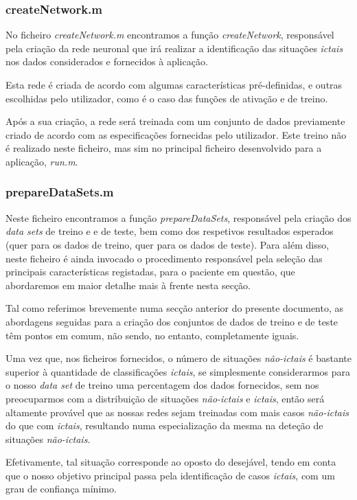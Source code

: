 \documentclass{article}
\begin{document}
\subsubsection{createNetwork.m}

No ficheiro \emph{createNetwork.m} encontramos a função \emph{createNetwork}, responsável pela criação da rede neuronal que irá realizar a identificação das  situações \emph{ictais} nos dados considerados e fornecidos à aplicação. 

Esta rede é criada de acordo com algumas características pré-definidas, e outras escolhidas pelo utilizador, como é o caso das funções de ativação e de treino.

Após a sua criação, a rede será treinada com um conjunto de dados previamente criado de acordo com as especificações fornecidas pelo utilizador. Este treino não é realizado neste ficheiro, mas sim no principal ficheiro desenvolvido para a aplicação, \emph{run.m}.

\subsubsection{prepareDataSets.m}

Neste ficheiro encontramos a função \emph{prepareDataSets}, responsável pela criação dos \emph{data sets} de treino e e de teste, bem como dos respetivos resultados esperados (quer para os dados de treino, quer para os dados de teste). Para além disso, neste ficheiro é ainda invocado o procedimento responsável pela seleção das principais características registadas, para o paciente em questão, que abordaremos em maior detalhe mais à frente nesta secção.

Tal como referimos brevemente numa secção anterior do presente documento, as abordagens seguidas para a criação dos conjuntos de dados de treino e de teste têm pontos em comum, não sendo, no entanto, completamente iguais.

Uma vez que, nos ficheiros fornecidos, o número de situações \emph{não-ictais} é bastante superior à quantidade de classificações \emph{ictais}, se simplesmente considerarmos para o nosso \emph{data set} de treino uma percentagem dos dados fornecidos, sem nos preocuparmos com a distribuição de situações \emph{não-ictais} e \emph{ictais}, então será altamente provável que as nossas redes sejam treinadas com mais casos \emph{não-ictais} do que com \emph{ictais}, resultando numa especialização da mesma na deteção de situações \emph{não-ictais}.

Efetivamente, tal situação corresponde ao oposto do desejável, tendo em conta que o nosso objetivo principal passa pela identificação de casos \emph{ictais}, com um grau de confiança mínimo.
\end{document}
